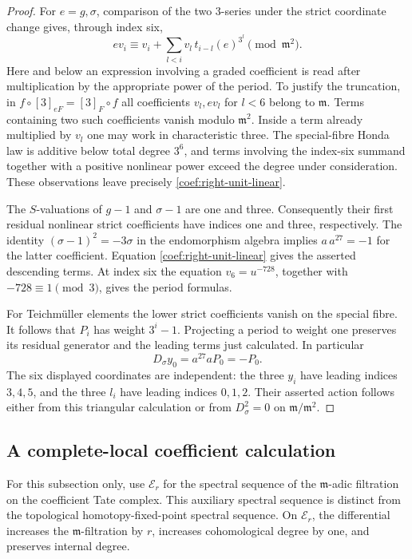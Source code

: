 \documentclass[11pt]{article}
\theoremstyle{definition}
\theoremstyle{remark}
\numberwithin{equation}{section}
\begin{document}
\begin{proof}
For \(e=g,\sigma\), comparison of the two 3-series under the strict
coordinate change gives, through index six,
\begin{equation}\label{coef:right-unit-linear}
 ev_i\equiv v_i+\sum_{l<i}v_l\,t_{i-l}(e)^{3^l}
 \pmod{\mathfrak m^2}.
\end{equation}
Here and below an expression involving a graded coefficient is read
after multiplication by the appropriate power of the period.
To justify the truncation, in
\(f\circ[3]_{eF}=[3]_F\circ f\) all coefficients \(v_l,ev_l\) for
\(l<6\) belong to \(\mathfrak m\).  Terms containing two such coefficients
vanish modulo \(\mathfrak m^2\).  Inside a term already multiplied by \(v_l\)
one may work in characteristic three.  The special-fibre Honda law is
additive below total degree \(3^6\), and terms involving the
index-six summand together with a positive nonlinear power exceed the
degree under consideration.  These observations leave precisely
\eqref{coef:right-unit-linear}.

The \(S\)-valuations of \(g-1\) and \(\sigma-1\) are one and three.
Consequently their first residual nonlinear strict coefficients have
indices one and three, respectively.  The identity
\((\sigma-1)^2=-3\sigma\) in the endomorphism algebra implies
\(a\,a^{27}=-1\) for the latter coefficient.  Equation
\eqref{coef:right-unit-linear} gives the asserted descending terms.
At index six the equation \(v_6=u^{-728}\), together with
\(-728\equiv1\pmod3\), gives the period formulas.

For Teichm\"uller elements the lower strict coefficients vanish on the
special fibre.  It follows that \(P_i\) has weight \(3^i-1\).
Projecting a period to weight one preserves its residual generator and
the leading terms just calculated.  In particular
\[
 D_\sigma y_0=a^{27}aP_0=-P_0.
\]
The six displayed coordinates are independent: the three \(y_i\)
have leading indices \(3,4,5\), and the three \(l_i\) have leading
indices \(0,1,2\).  Their asserted action follows either from this
triangular calculation or from
\(D_\sigma^2=0\) on \(\mathfrak m/\mathfrak m^2\).
\end{proof}

\subsection{A complete-local coefficient calculation}

For this subsection only, use \(\mathcal E_r\) for the spectral sequence
of the \(\mathfrak m\)-adic filtration on the coefficient Tate complex.  This
auxiliary spectral sequence is distinct from the topological
homotopy-fixed-point spectral sequence.  On \(\mathcal E_r\), the
differential increases the \(\mathfrak m\)-filtration by \(r\), increases
cohomological degree by one, and preserves internal degree.
\end{document}

